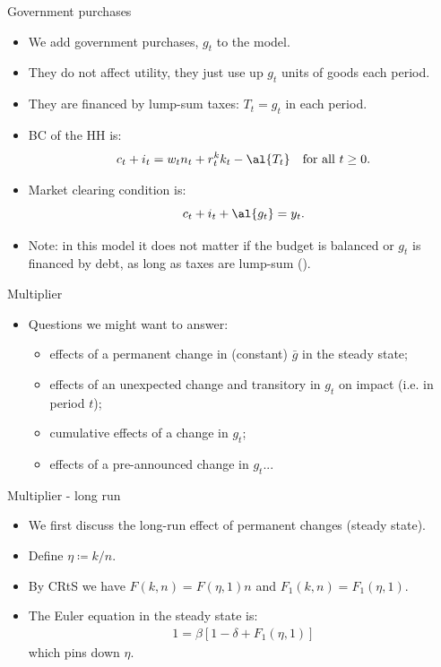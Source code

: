 \documentclass[11pt,xcolor={dvipsnames},aspectratio=159,hyperref={pdftex,pdfpagemode=UseNone,hidelinks,pdfdisplaydoctitle=true},usepdftitle=false]{beamer}
\begin{document}
\begin{frame}{Government purchases}
    \begin{itemize}
    \item We add government purchases, $g_{t}$ to the model.
    \item They do not affect utility, they just use up $g_{t}$ units of goods
    each period.
    \item They are financed by lump-sum taxes: $T_{t}=g_{t}$ in each period.
    \item BC of the HH is: 
    \[
    c_{t}+i_{t}=w_{t}n_{t}+r_{t}^{k}k_{t}-\al{T_t}\quad\text{for all }t\geq0.
    \]
    \item Market clearing condition is: 
    \[
    c_{t}+i_{t}+\al{g_t}=y_{t}.
    \]
    \item Note: in this model it does not matter if the budget is balanced or $g_t$ is financed by debt, as long as taxes are lump-sum (). 
    \end{itemize}
    \end{frame}
    \begin{frame}{Multiplier}
    \begin{itemize}
    \item Questions we might want to answer:
    \begin{itemize}
    \item effects of a permanent change in (constant) $\bar{g}$ in the steady
    state;
    \item effects of an unexpected change and transitory in $g_{t}$ on impact
    (i.e. in period $t$);
    \item cumulative effects of a change in $g_{t}$; 
    \item effects of a pre-announced change in $g_{t}$...
    \end{itemize}
    \end{itemize}
    
    \end{frame}

    \begin{frame}{Multiplier - long run}
        \begin{itemize}
        \item We first discuss the long-run effect of permanent changes (steady state).
        \item Define $\eta\coloneqq k \slash n$.
        \item By CRtS we have $F\left(k,n\right)=F\left(\eta,1\right)n$ and $F_{1}\left(k,n\right)=F_{1}\left(\eta,1\right)$.
        \item The Euler equation in the steady state is: 
        \begin{align*}
            1 = \beta\left[1-\delta+F_{1}\left(\eta,1\right)\right]\tag{EE}\label{EE-1-1}
        \end{align*}
        which pins down $\eta$. 
        \end{itemize}
        \end{frame}
\end{document}
